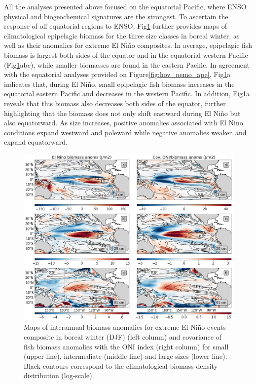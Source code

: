 All the analyses presented above focused on the equatorial Pacific, where ENSO physical and biogeochemical signatures are the strongest. To ascertain the response of off equatorial regions to ENSO,  Fig\ref{fig:mean_ond97_ape} further provides maps of climatological epipelagic biomass for the three size classes in boreal winter, as well as their anomalies for extreme El Niño composites.  In average, epipelagic fish biomass is largest both sides of the equator and in the equatorial western Pacific (Fig\ref{fig:mean_ond97_ape}abc), while smaller biomasses  are found in the eastern Pacific. In agreement with the equatorial analyses provided on Figure\ref{fig:hov_nemo_ape}, Fig\ref{fig:mean_ond97_ape}a indicates that, during El Niño, small epipelagic fish biomass increases in the equatorial eastern Pacific and decreases in the western Pacific. In addition, Fig\ref{fig:mean_ond97_ape}a reveals that this biomass also decreases both sides of the equator, further highlighting that the biomass does not only shift eastward during El Niño but also equatorward.
As size increases, positive anomalies associated with El Nino conditions expand westward and poleward while negative anomalies weaken and expand equatorward. 

\begin{figure}[h!tp]
	\centering
	\includegraphics[scale=0.4]{figs/map_mean_anom_OND_97.png}	
	\caption{Maps of interannual biomass anomalies for extreme El Niño events composite in boreal winter (DJF) (left column) and covariance of fish biomass anomalies with the ONI index (right column) for small (upper line), intermediate (middle line) and large sizes (lower line). Black contours correspond to the climatological biomass density distribution (log-scale).}	
	\label{fig:mean_ond97_ape}
\end{figure}


